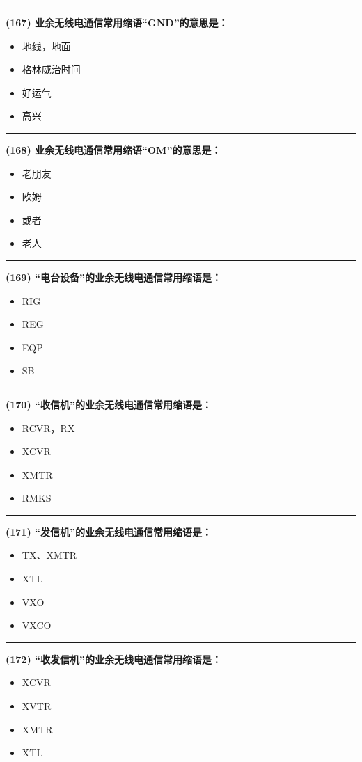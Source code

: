 \documentclass[twocolumn]{ctexart}  %
\begin{document}
\noindent\rule{0.5\textwidth}{1pt}
\heiti \textbf{(167) 业余无线电通信常用缩语“GND”的意思是：} \songti {\color{gray} [LK0361] }
\begin{itemize}
	\item  地线，地面
	\item  格林威治时间
	\item  好运气
	\item  高兴
\end{itemize}


\noindent\rule{0.5\textwidth}{1pt}
\heiti \textbf{(168) 业余无线电通信常用缩语“OM”的意思是：} \songti {\color{gray} [LK0373] }
\begin{itemize}
	\item  老朋友
	\item  欧姆
	\item  或者
	\item  老人
\end{itemize}


\noindent\rule{0.5\textwidth}{1pt}
\heiti \textbf{(169) “电台设备”的业余无线电通信常用缩语是：} \songti {\color{gray} [LK0376] }
\begin{itemize}
	\item  RIG
	\item  REG
	\item  EQP
	\item  SB
\end{itemize}


\noindent\rule{0.5\textwidth}{1pt}
\heiti \textbf{(170) “收信机”的业余无线电通信常用缩语是：} \songti {\color{gray} [LK0379] }
\begin{itemize}
	\item  RCVR，RX
	\item  XCVR
	\item  XMTR
	\item  RMKS
\end{itemize}


\noindent\rule{0.5\textwidth}{1pt}
\heiti \textbf{(171) “发信机”的业余无线电通信常用缩语是：} \songti {\color{gray} [LK0380] }
\begin{itemize}
	\item  TX、XMTR
	\item  XTL
	\item  VXO
	\item  VXCO
\end{itemize}


\noindent\rule{0.5\textwidth}{1pt}
\heiti \textbf{(172) “收发信机”的业余无线电通信常用缩语是：} \songti {\color{gray} [LK0381] }
\begin{itemize}
	\item  XCVR
	\item  XVTR
	\item  XMTR
	\item  XTL
\end{itemize}
\end{document}
